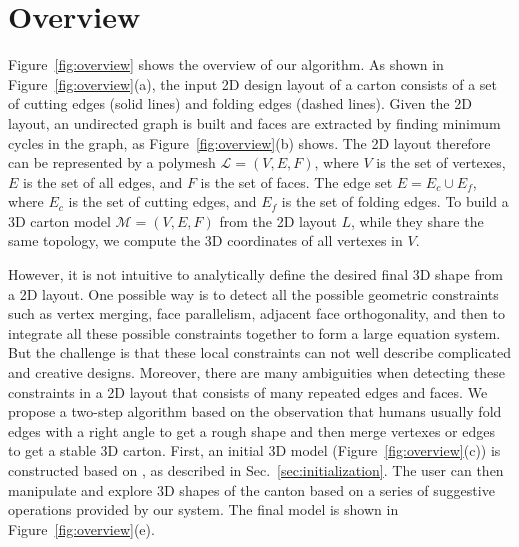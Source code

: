 \section{Overview}\label{sec:overview}




 
Figure~\ref{fig:overview} shows the overview of our algorithm. 
As shown in Figure~\ref{fig:overview}(a), the input 2D design layout of a carton consists of a set of cutting edges (solid lines) and folding edges (dashed lines).
%
Given the 2D layout, an undirected graph is built and faces are extracted by finding minimum cycles in the graph, as Figure~\ref{fig:overview}(b) shows. 
The 2D layout therefore can be represented by a polymesh $\mathcal{L}=(V,E,F)$, where $V$ is the set of vertexes, $E$ is the set of all edges, and $F$ is the set of faces. 
The edge set $E=E_c\cup E_f$, where $E_c$ is the set of cutting edges, and $E_f$ is the set of folding edges.
%
To build a 3D carton model $\mathcal{M}=(V, E, F)$ from the 2D layout $L$, while they share the same topology, we compute the 3D coordinates of all vertexes in $V$. 
%

However, it is not intuitive to analytically define the desired final 3D shape from a 2D layout. 
One possible way is to detect all the possible geometric constraints such as vertex merging, face parallelism, adjacent face orthogonality, and then to integrate all these possible constraints together to form a large equation system. 
But the challenge is that these local constraints can not well describe complicated and creative designs. 
Moreover, there are many ambiguities when detecting these constraints in a 2D layout that consists of many repeated edges and faces. 
%
We propose a two-step algorithm based on the observation that humans usually fold edges with a right angle to get a rough shape and then merge vertexes or edges to get a stable 3D carton.
First, an initial 3D model (Figure~\ref{fig:overview}(c)) is constructed based on , as described in Sec.~\ref{sec:initialization}.
The user can then manipulate and explore 3D shapes of the canton based on a series of suggestive operations provided by our system. 
%
The final model is shown in Figure~\ref{fig:overview}(e).

